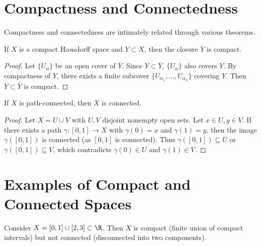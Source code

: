 \section{Compactness and Connectedness}
\label{sec:compactness-connectedness}

Compactness and connectedness are intimately related through various theorems.

\begin{theorem}
\label{thm:compact-quasi-compact}
If $X$ is a compact Hausdorff space and $Y \subset X$, then the closure $\overline{Y}$ is compact.
\end{theorem}

\begin{proof}
Let $\{U_\alpha\}$ be an open cover of $\overline{Y}$. Since $Y \subset \overline{Y}$, $\{U_\alpha\}$ also covers $Y$. By compactness of $Y$, there exists a finite subcover $\{U_{\alpha_1}, \ldots, U_{\alpha_n}\}$ covering $Y$. Then $\overline{Y} \subset \overline{Y}$ is compact.
\end{proof}

\begin{theorem}
\label{thm:path-connected-connected}
If $X$ is path-connected, then $X$ is connected.
\end{theorem}

\begin{proof}
Let $X = U \cup V$ with $U, V$ disjoint nonempty open sets. Let $x \in U, y \in V$. If there exists a path $\gamma: [0, 1] \to X$ with $\gamma(0) = x$ and $\gamma(1) = y$, then the image $\gamma([0, 1])$ is connected (as $[0, 1]$ is connected). Thus $\gamma([0, 1]) \subseteq U$ or $\gamma([0, 1]) \subseteq V$, which contradicts $\gamma(0) \in U$ and $\gamma(1) \in V$.
\end{proof}

\section{Examples of Compact and Connected Spaces}
\label{sec:compact-connected-examples}

\begin{example}
\label{ex:compact-not-connected}
Consider $X = [0, 1] \cup [2, 3] \subset \R$. Then $X$ is compact (finite union of compact intervals) but not connected (disconnected into two components).

\end{example}


